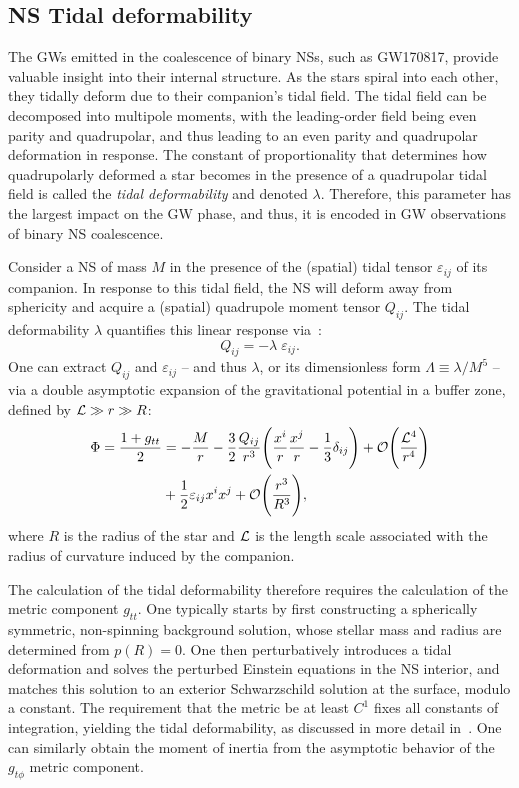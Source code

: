 \documentclass[prd,twocolumn,nofootinbib,superscriptaddress,amsmath,amssymb]{revtex4-1}
\begin{document}
\subsection{NS Tidal deformability}\label{tidal}

The GWs emitted in the coalescence of binary NSs, such as GW170817, provide valuable insight into their internal structure. As the stars spiral into each other, they tidally deform due to their companion's tidal field. The tidal field can be decomposed into multipole moments, with the leading-order field being even parity and quadrupolar, and thus leading to an even parity and quadrupolar deformation in response. The constant of proportionality that determines how quadrupolarly deformed a star becomes in the presence of a quadrupolar tidal field is called the \emph{tidal deformability} and denoted $\lambda$. Therefore, this parameter has the largest impact on the GW phase, and thus, it is encoded in GW observations of binary NS coalescence.  

Consider a NS of mass $M$ in the presence of the (spatial) tidal tensor $\varepsilon_{ij}$ of its companion. In response to this tidal field, the NS will deform away from sphericity and acquire a (spatial) quadrupole moment tensor $Q_{ij}$. The tidal deformability $\lambda$ quantifies this linear response via~\cite{Flanagan2008,hinderer-love,Yagi2013}:
\begin{equation}
Q_{ij}=-\lambda \; \varepsilon_{ij}.
\end{equation}
One can extract $Q_{ij}$ and $\varepsilon_{ij}$ -- and thus $\lambda$, or its dimensionless form $\Lambda \equiv \lambda/M^5$ -- via a double asymptotic expansion of the gravitational potential in a buffer zone, defined by ${\cal{L}} \gg r \gg R$:
\begin{align}
\Phi=\frac{1+g_{tt}}{2}&=-\frac{M}{r} - \frac{3}{2}\frac{Q_{ij}}{r^3} \Bigg(\frac{x^i}{r} \frac{x^j}{r}-\frac{1}{3}\delta_{ij} \Bigg) + \mathcal{O} \Bigg( \frac{{\cal{L}}^4}{r^4} \Bigg)
\nonumber \\ &+ \frac{1}{2} \varepsilon_{ij} x^i x^j + \mathcal{O} \Bigg( \frac{r^3}{R^3} \Bigg),
\end{align}
where $R$ is the radius of the star and ${\cal{L}}$ is the length scale associated with the radius of curvature induced by the companion. 

The calculation of the tidal deformability therefore requires the calculation of the metric component $g_{tt}$. One typically starts by first constructing a spherically symmetric, non-spinning background solution, whose stellar mass and radius are determined from $p(R)=0$. One then perturbatively introduces a tidal deformation and solves the perturbed Einstein equations in the NS interior, and matches this solution to an exterior Schwarzschild solution at the surface, modulo a constant. The requirement that the metric be at least $C^{1}$ fixes all constants of integration, yielding the tidal deformability, as discussed in more detail in~\cite{hinderer-love}. One can similarly obtain the moment of inertia from the asymptotic behavior of the $g_{t \phi}$ metric component.
\end{document}
